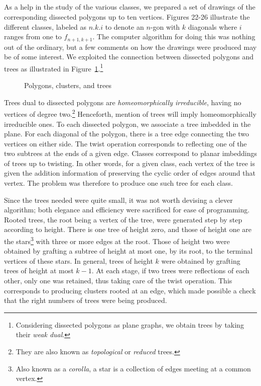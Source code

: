 \documentclass[10pt]{amsart}
\begin{document}
\subsection{}
As a help in the study of the various classes, we prepared a set of drawings of the corresponding dissected polygons up to ten vertices. Figures 22-26 illustrate the different classes, labeled as $n.k.i$ to denote an $n$-gon with $k$ diagonals where $i$ ranges from one to $f_{n+1,k+1}$. The computer algorithm for doing this was nothing out of the ordinary, but a few comments on how the drawings were produced may be of some interest. We exploited the connection between dissected polygons and trees as illustrated in Figure~\ref{f:pct}.\footnote{Considering dissected polygons as plane graphs, we obtain trees by taking their {\em weak dual}.}
\begin{figure}[h]
\caption{Polygons, clusters, and trees}
\label{f:pct}
\end{figure}
Trees dual to dissected polygons are {\em homeomorphically irreducible}, having no vertices of degree two.\footnote{They are also known as {\em topological} or {\em reduced} trees.} Henceforth, mention of trees will imply homeomorphically irreducible ones. To each dissected polygon, we associate a tree imbedded in the plane. For each diagonal of the polygon, there is a tree edge connecting the two vertices on either side. The twist operation corresponds to reflecting one of the two subtrees at the ends of a given edge. Classes correspond to planar imbeddings of trees up to twisting.  In other words, for a given class, each vertex of the tree is given the addition information of preserving the cyclic order of edges around that vertex. The problem was therefore to produce one such tree for each class.

Since the trees needed were quite small, it was not worth devising a clever algorithm; both elegance and efficiency were sacrificed for ease of programming.  Rooted trees, the root being a vertex of the tree, were generated step by step according to height.   There is one tree of height zero, and those of height one are the stars\footnote{Also known as a {\em corolla}, a star is a collection of edges meeting at a common vertex.} with three or more edges at the root.  Those of height two were obtained by grafting a subtree of height at most one, by its root, to the terminal vertices of these stars.  In general, trees of height $k$ were obtained by grafting trees of height at most $k - 1$. At each stage, if two trees were reflections of each other, only one was retained, thus taking care of the twist operation.  This corresponds to producing clusters rooted at an edge, which made possible a check that the right numbers of trees were being produced.
\end{document}
